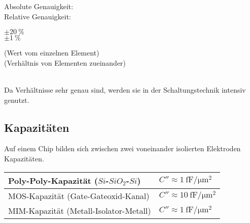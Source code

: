 \begin{minipage}[c]{0.22\textwidth}
	Absolute Genauigkeit:\\Relative Genauigkeit:
\end{minipage}
\begin{minipage}[c]{0.06\textwidth}
	$\pm \SI{20}{\percent}$\\ $\pm \SI{1}{\percent}$
\end{minipage}
\begin{minipage}[c]{0.5\textwidth}
	(Wert vom einzelnen Element)\\(Verhältnis von Elementen zueinander)
\end{minipage}\\[1ex]
Da Verhältnisse sehr genau sind, werden sie in der Schaltungstechnik intensiv genutzt.

\subsection{Kapazitäten}
Auf einem Chip bilden sich zwischen zwei voneinander isolierten Elektroden Kapazitäten.
\\[2ex]
\begin{minipage}[c]{0.55\textwidth}
	\begin{tabular}{|l|l|}
		\hline
		Poly-Poly-Kapazität ($Si$-$SiO_2$-$Si$) & $C'' \approx \SI{1}{\femto \farad \per \micro \meter ^2}$\\ \hline
		MOS-Kapazität (Gate-Gateoxid-Kanal) & $C'' \approx \SI{10}{\femto \farad \per \micro \meter ^2}$\\ \hline
		MIM-Kapazität (Metall-Isolator-Metall) & $C'' \approx \SI{1}{\femto \farad \per \micro \meter ^2}$ \\ \hline
	\end{tabular}
\end{minipage}
